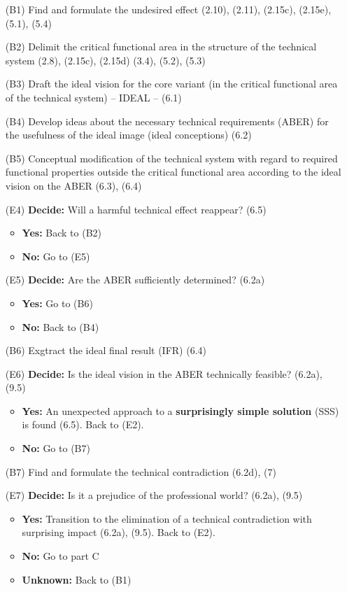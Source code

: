 \documentclass[11pt,a4paper]{article}
\begin{document}
\begin{itemize}[leftmargin=30pt]
\item[(B1)] Find and formulate the undesired effect (2.10), (2.11), (2.15c),
  (2.15e), (5.1), (5.4)
\item[(B2)] Delimit the critical functional area in the structure of the
  technical system (2.8), (2.15c), (2.15d) (3.4), (5.2), (5.3)
\item[(B3)] Draft the ideal vision for the core variant (in the critical
  functional area of the technical system) -- IDEAL -- (6.1)
\item[(B4)] Develop ideas about the necessary technical requirements (ABER)
  for the usefulness of the ideal image (ideal conceptions) (6.2)
\item[(B5)] Conceptual modification of the technical system with regard to
  required functional properties outside the critical functional area
  according to the ideal vision on the ABER (6.3), (6.4)
\item[(E4)] \textbf{Decide:} Will a harmful technical effect reappear?  (6.5)
  \begin{itemize}[leftmargin=20pt,noitemsep]
  \item \textbf{Yes:} Back to (B2)
  \item \textbf{No:} Go to (E5)
  \end{itemize}
\item[(E5)] \textbf{Decide:} Are the ABER sufficiently determined? (6.2a)
  \begin{itemize}[leftmargin=20pt,noitemsep]
  \item \textbf{Yes:} Go to  (B6)
  \item \textbf{No:} Back to (B4)
  \end{itemize}
\item[(B6)] Exgtract the ideal final result (IFR) (6.4)
\item[(E6)] \textbf{Decide:} Is the ideal vision in the ABER technically
  feasible?  (6.2a), (9.5)
  \begin{itemize}[leftmargin=20pt,noitemsep]
  \item \textbf{Yes:} An unexpected approach to a \textbf{surprisingly simple
    solution} (SSS) is found (6.5). Back to (E2). 
  \item \textbf{No:} Go to (B7)
  \end{itemize}
\item[(B7)] Find and formulate the technical contradiction (6.2d), (7)
\item[(E7)] \textbf{Decide:} Is it a prejudice of the professional world?
  (6.2a), (9.5)
  \begin{itemize}[leftmargin=20pt,noitemsep]
  \item \textbf{Yes:} Transition to the elimination of a technical
    contradiction with surprising impact (6.2a), (9.5). Back to (E2).
  \item \textbf{No:} Go to part C
  \item \textbf{Unknown:} Back to (B1)
  \end{itemize}
\end{itemize}
\end{document}
